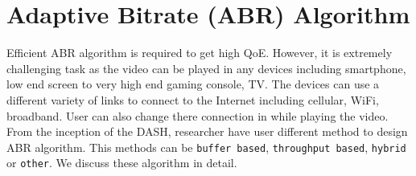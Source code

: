 \section{Adaptive Bitrate (ABR) Algorithm}
Efficient ABR algorithm is required to get high QoE. However, it is extremely challenging task as the video can be played in any devices including smartphone, low end screen to very high end gaming console, TV. The devices can use a different variety of links to connect to the Internet including cellular, WiFi, broadband. User can also change there connection in while playing the video. From the inception of the DASH, researcher have user different method to design ABR algorithm. This methods can be {\tt buffer based}, {\tt throughput based}, {\tt hybrid} or {\tt other}. We discuss these algorithm in detail.

